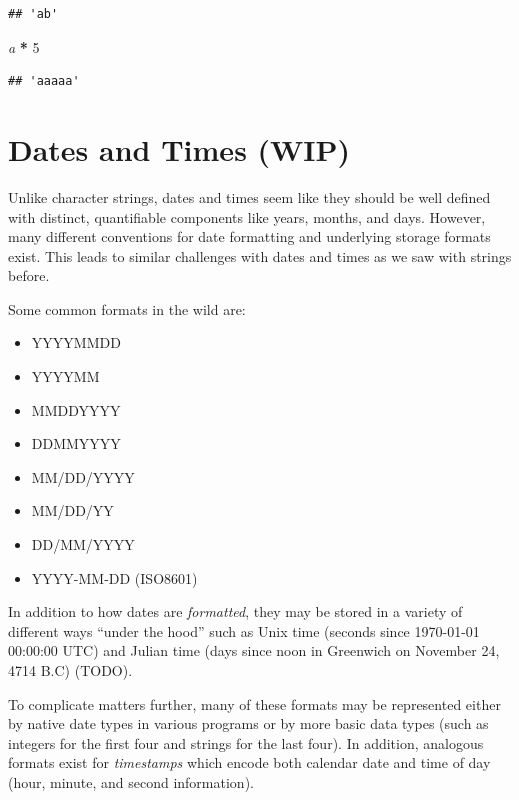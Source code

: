 \documentclass[
]{krantz}
\makeatletter
\newenvironment{Shaded}{\begin{snugshade}}{\end{snugshade}}
\newcommand{\CommentTok}[1]{\textcolor[rgb]{0.37,0.37,0.37}{\textit{#1}}}
\newcommand{\DecValTok}[1]{\textcolor[rgb]{0.06,0.06,0.06}{#1}}
\newcommand{\OperatorTok}[1]{\textcolor[rgb]{0.43,0.43,0.43}{\textbf{#1}}}
\providecommand{\tightlist}{%
  \setlength{\itemsep}{0pt}\setlength{\parskip}{0pt}}
\newenvironment{kframe}{%
\medskip{}
\setlength{\fboxsep}{.8em}
 \def\at@end@of@kframe{}%
 \ifinner\ifhmode%
  \def\at@end@of@kframe{\end{minipage}}%
  \begin{minipage}{\columnwidth}%
 \fi\fi%
 \def\FrameCommand##1{\hskip\@totalleftmargin \hskip-\fboxsep
 \colorbox{shadecolor}{##1}\hskip-\fboxsep
     \hskip-\linewidth \hskip-\@totalleftmargin \hskip\columnwidth}%
 \MakeFramed {\advance\hsize-\width
   \@totalleftmargin\z@ \linewidth\hsize
   \@setminipage}}%
 {\par\unskip\endMakeFramed%
 \at@end@of@kframe}
\renewenvironment{Shaded}{\begin{kframe}}{\end{kframe}}
\makeatother
\begin{document}
\begin{verbatim}
## 'ab'
\end{verbatim}

\begin{Shaded}
\begin{Highlighting}[]
\CommentTok{\textquotesingle{}a\textquotesingle{}} \OperatorTok{*} \DecValTok{5}
\end{Highlighting}
\end{Shaded}

\begin{verbatim}
## 'aaaaa'
\end{verbatim}

\hypertarget{dates-and-times-wip}{%
\section{Dates and Times (WIP)}\label{dates-and-times-wip}}

Unlike character strings, dates and times seem like they should be well defined with distinct, quantifiable components like years, months, and days. However, many different conventions for date formatting and underlying storage formats exist. This leads to similar challenges with dates and times as we saw with strings before.

Some common formats in the wild are:

\begin{itemize}
\tightlist
\item
  YYYYMMDD
\item
  YYYYMM
\item
  MMDDYYYY
\item
  DDMMYYYY
\item
  MM/DD/YYYY
\item
  MM/DD/YY
\item
  DD/MM/YYYY
\item
  YYYY-MM-DD (ISO8601)
\end{itemize}

In addition to how dates are \emph{formatted}, they may be stored in a variety of different ways ``under the hood'' such as Unix time (seconds since 1970-01-01 00:00:00 UTC) and Julian time (days since noon in Greenwich on November 24, 4714 B.C) (TODO).

To complicate matters further, many of these formats may be represented either by native date types in various programs or by more basic data types (such as integers for the first four and strings for the last four). In addition, analogous formats exist for \emph{timestamps} which encode both calendar date and time of day (hour, minute, and second information).
\end{document}
